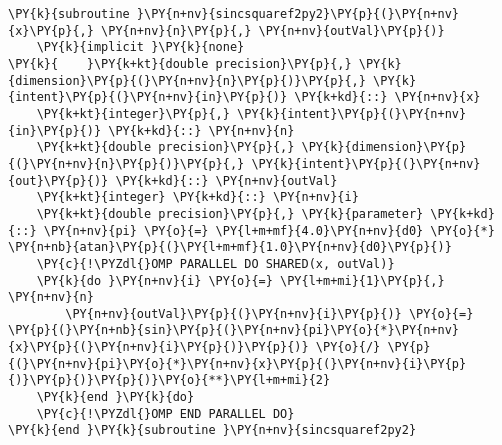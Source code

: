 \begin{Verbatim}[commandchars=\\\{\}]
\PY{k}{subroutine }\PY{n+nv}{sincsquaref2py2}\PY{p}{(}\PY{n+nv}{x}\PY{p}{,} \PY{n+nv}{n}\PY{p}{,} \PY{n+nv}{outVal}\PY{p}{)}
    \PY{k}{implicit }\PY{k}{none}
\PY{k}{    }\PY{k+kt}{double precision}\PY{p}{,} \PY{k}{dimension}\PY{p}{(}\PY{n+nv}{n}\PY{p}{)}\PY{p}{,} \PY{k}{intent}\PY{p}{(}\PY{n+nv}{in}\PY{p}{)} \PY{k+kd}{::} \PY{n+nv}{x}
    \PY{k+kt}{integer}\PY{p}{,} \PY{k}{intent}\PY{p}{(}\PY{n+nv}{in}\PY{p}{)} \PY{k+kd}{::} \PY{n+nv}{n}
    \PY{k+kt}{double precision}\PY{p}{,} \PY{k}{dimension}\PY{p}{(}\PY{n+nv}{n}\PY{p}{)}\PY{p}{,} \PY{k}{intent}\PY{p}{(}\PY{n+nv}{out}\PY{p}{)} \PY{k+kd}{::} \PY{n+nv}{outVal}
    \PY{k+kt}{integer} \PY{k+kd}{::} \PY{n+nv}{i}
    \PY{k+kt}{double precision}\PY{p}{,} \PY{k}{parameter} \PY{k+kd}{::} \PY{n+nv}{pi} \PY{o}{=} \PY{l+m+mf}{4.0}\PY{n+nv}{d0} \PY{o}{*} \PY{n+nb}{atan}\PY{p}{(}\PY{l+m+mf}{1.0}\PY{n+nv}{d0}\PY{p}{)}
    \PY{c}{!\PYZdl{}OMP PARALLEL DO SHARED(x, outVal)}
    \PY{k}{do }\PY{n+nv}{i} \PY{o}{=} \PY{l+m+mi}{1}\PY{p}{,} \PY{n+nv}{n}
        \PY{n+nv}{outVal}\PY{p}{(}\PY{n+nv}{i}\PY{p}{)} \PY{o}{=} \PY{p}{(}\PY{n+nb}{sin}\PY{p}{(}\PY{n+nv}{pi}\PY{o}{*}\PY{n+nv}{x}\PY{p}{(}\PY{n+nv}{i}\PY{p}{)}\PY{p}{)} \PY{o}{/} \PY{p}{(}\PY{n+nv}{pi}\PY{o}{*}\PY{n+nv}{x}\PY{p}{(}\PY{n+nv}{i}\PY{p}{)}\PY{p}{)}\PY{p}{)}\PY{o}{**}\PY{l+m+mi}{2}
    \PY{k}{end }\PY{k}{do}
    \PY{c}{!\PYZdl{}OMP END PARALLEL DO}
\PY{k}{end }\PY{k}{subroutine }\PY{n+nv}{sincsquaref2py2}
\end{Verbatim}
